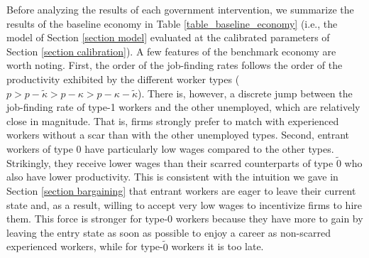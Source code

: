 \documentclass[12pt]{article} %
\theoremstyle{definition}
\begin{document}
Before analyzing the results of each government intervention, we summarize the results of the baseline economy in Table \ref{table_baseline_economy} (i.e., the model of Section \ref{section model} evaluated at the calibrated parameters of Section \ref{section calibration}).
A few features of the benchmark economy are worth noting.
First, the order of the job-finding rates follows the order of the productivity exhibited by the different worker types ($p > p - \tilde{\kappa} > p - \kappa > p - \kappa - \tilde{\kappa}$).
There is, however, a discrete jump between the job-finding rate of type-1 workers and the other unemployed, which are relatively close in magnitude.
That is, firms strongly prefer to match with experienced workers without a scar than with the other unemployed types.
Second, entrant workers of type 0 have particularly low wages compared to the other types.
Strikingly, they receive lower wages than their scarred counterparts of type $\tilde{0}$ who also have lower productivity.
This is consistent with the intuition we gave in Section \ref{section bargaining} that entrant workers are eager to leave their current state and, as a result, willing to accept very low wages to incentivize firms to hire them.
This force is stronger for type-0 workers because they have more to gain by leaving the entry state as soon as possible to enjoy a career as non-scarred experienced workers, while for type-$\tilde{0}$ workers it is too late.
\end{document}
